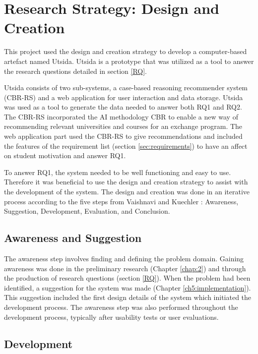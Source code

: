 \section{Research Strategy: Design and Creation}

This project used the design and creation strategy to develop a computer-based artefact named Utsida. Utsida is a prototype that was utilized as a tool to answer the research questions detailed in section \ref{RQ}.   

Utsida consists of two sub-systems, a case-based reasoning recommender system (CBR-RS) and a web application for user interaction and data storage. Utsida was used as a tool to generate the data needed to answer both RQ1 and RQ2. The CBR-RS incorporated the AI methodology CBR to enable a new way of recommending relevant universities and courses for an exchange program. The web application part used the CBR-RS to give recommendations and included the features of the requirement list (section \ref{sec:requirements}) to have an affect on student motivation and answer RQ1.

To answer RQ1, the system needed to be well functioning and easy to use. Therefore it was beneficial to use the design and creation strategy to assist with the development of the system. The design and creation was done in an iterative process according to the five steps from Vaishnavi and Kuechler \cite{vaishnavi2004design}: Awareness, Suggestion, Development, Evaluation, and Conclusion.

\subsection{Awareness and Suggestion}

The awareness step involves finding and defining the problem domain. Gaining awareness was done in the preliminary research (Chapter \ref{chap:2}) and through the production of research questions (section \ref{RQ}). When the problem had been identified, a suggestion for the system was made (Chapter \ref{ch5:implementation}). This suggestion included the first design details of the system which initiated the development process. The awareness step was also performed throughout the development process, typically after usability tests or user evaluations. 

\subsection{Development}

